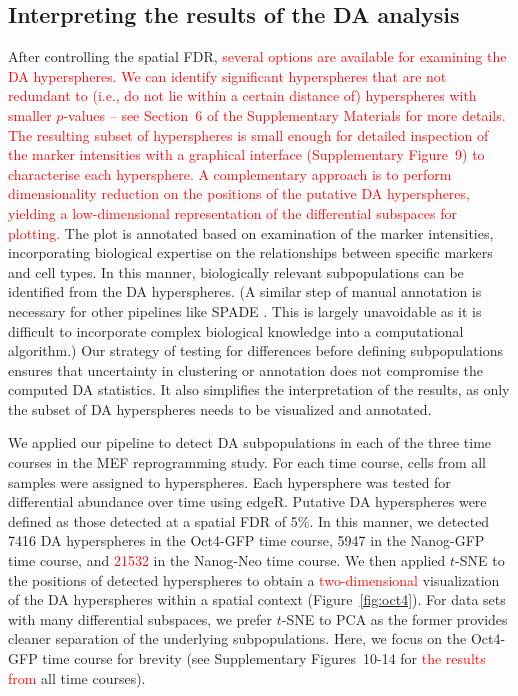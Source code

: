\documentclass{article}
\newcommand\revised[1]{\textcolor{red}{#1}}
\newcommand{\suppinterpret}{6}
\newcommand{\suppfiginterpret}{9}
\newcommand{\suppfigrealextra}{10-14}
\begin{document}
\subsection{Interpreting the results of the DA analysis}
After controlling the spatial FDR, \revised{several options are available for examining the DA hyperspheres.
We can identify significant hyperspheres that are not redundant to (i.e., do not lie within a certain distance of) hyperspheres with smaller $p$-values -- see Section~\suppinterpret{} of the Supplementary Materials for more details.
The resulting subset of hyperspheres is small enough for detailed inspection of the marker intensities with a graphical interface (Supplementary Figure~\suppfiginterpret{}) to characterise each hypersphere.
A complementary approach is to perform dimensionality reduction on the positions of the putative DA hyperspheres, yielding a low-dimensional representation of the differential subspaces for plotting.}
The plot is annotated based on examination of the marker intensities, incorporating biological expertise on the relationships between specific markers and cell types.
In this manner, biologically relevant subpopulations can be identified from the DA hyperspheres.
(A similar step of manual annotation is necessary for other pipelines like SPADE \cite{anchang2016visualization}.
This is largely unavoidable as it is difficult to incorporate complex biological knowledge into a computational algorithm.)
Our strategy of testing for differences before defining subpopulations ensures that uncertainty in clustering or annotation does not compromise the computed DA statistics.
It also simplifies the interpretation of the results, as only the subset of DA hyperspheres needs to be visualized and annotated.

We applied our pipeline to detect DA subpopulations in each of the three time courses in the MEF reprogramming study.
For each time course, cells from all samples were assigned to hyperspheres.
Each hypersphere was tested for differential abundance over time using edgeR.
Putative DA hyperspheres were defined as those detected at a spatial FDR of 5\%.
In this manner, we detected 7416 DA hyperspheres in the Oct4-GFP time course, 5947 in the Nanog-GFP time course, and \revised{21532} in the Nanog-Neo time course.
We then applied $t$-SNE \cite{van2008visualizing} to the positions of detected hyperspheres to obtain a \revised{two-dimensional} visualization of the DA hyperspheres within a spatial context (Figure~\ref{fig:oct4}).
For data sets with many differential subspaces, we prefer $t$-SNE to PCA as the former provides cleaner separation of the underlying subpopulations.
Here, we focus on the Oct4-GFP time course for brevity (see Supplementary Figures~\suppfigrealextra{} for \revised{the results from} all time courses).
\end{document}

